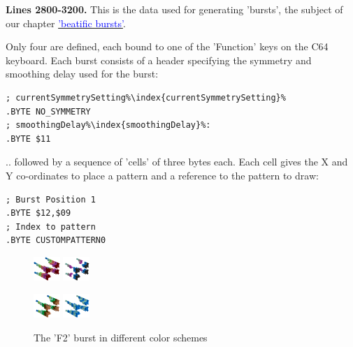 \clearpage
{}
\textbf{Lines 2800-3200.} This is the data used for generating 'bursts', the subject of our chapter
\hyperref[sec:bursts]{\textcolor{blue}{'beatific bursts'}}. 

Only four are defined, each bound to one of the 'Function' keys on the C64 keyboard. Each burst consists of
a header specifying the symmetry and smoothing delay used for the burst:
\begin{lstlisting}[escapechar=\%]
; currentSymmetrySetting%\index{currentSymmetrySetting}%
.BYTE NO_SYMMETRY
; smoothingDelay%\index{smoothingDelay}%:
.BYTE $11
\end{lstlisting}

.. followed by a sequence of 'cells' of three bytes each. Each cell gives the X and Y co-ordinates to place a pattern
and a reference to the pattern to draw:
\begin{lstlisting}[escapechar=\%]
; Burst Position 1
.BYTE $12,$09
; Index to pattern 
.BYTE CUSTOMPATTERN0
\end{lstlisting}
\vfill
\begin{figure}[H]
    \centering
    \begin{adjustbox}{width=9cm,center}
      \includegraphics[width=1cm]{src/listing_commentary/diagrams/pattern1-0-45.png}%
      \includegraphics[width=1cm]{src/listing_commentary/diagrams/pattern1-1-45.png}%
    \end{adjustbox}
    \begin{adjustbox}{width=9cm,center}
      \includegraphics[width=1cm]{src/listing_commentary/diagrams/pattern1-2-45.png}%
      \includegraphics[width=1cm]{src/listing_commentary/diagrams/pattern1-3-45.png}%
    \end{adjustbox}
    \caption{The 'F2' burst in different color schemes}
\end{figure}

